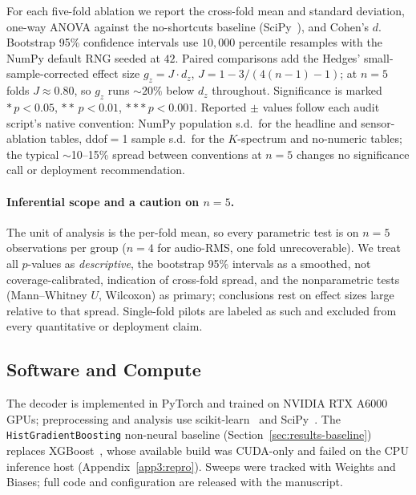 \documentclass[sensors,article,submit,moreauthors,pdftex]{Definitions/mdpi}
\begin{document}
For each five-fold ablation we report the cross-fold mean and standard deviation, one-way ANOVA against the no-shortcuts baseline (SciPy~\cite{virtanen2020scipy}), and Cohen's $d$. Bootstrap 95\% confidence intervals use $10{,}000$ percentile resamples with the NumPy default RNG seeded at $42$. Paired comparisons add the Hedges' small-sample-corrected effect size $g_z\!=\!J\!\cdot\!d_z$, $J\!=\!1\!-\!3/(4(n\!-\!1)\!-\!1)$; at $n\!=\!5$ folds $J\!\approx\!0.80$, so $g_z$ runs $\sim$$20\%$ below $d_z$ throughout. Significance is marked $\ast\,p<0.05$, $\ast\ast\,p<0.01$, $\ast\ast\ast\,p<0.001$. Reported $\pm$ values follow each audit script's native convention: NumPy population s.d.\ for the headline and sensor-ablation tables, ddof$=$1 sample s.d.\ for the $K$-spectrum and no-numeric tables; the typical $\sim$10--15\% spread between conventions at $n\!=\!5$ changes no significance call or deployment recommendation.

\paragraph{Inferential scope and a caution on $n=5$.} The unit of analysis is the per-fold mean, so every parametric test is on $n=5$ observations per group ($n=4$ for audio-RMS, one fold unrecoverable). We treat all $p$-values as \emph{descriptive}, the bootstrap 95\% intervals as a smoothed, not coverage-calibrated, indication of cross-fold spread, and the nonparametric tests (Mann--Whitney $U$, Wilcoxon) as primary; conclusions rest on effect sizes large relative to that spread. Single-fold pilots are labeled as such and excluded from every quantitative or deployment claim.

\subsection{Software and Compute}
\label{sec:software}

The decoder is implemented in PyTorch and trained on NVIDIA RTX A6000 GPUs; preprocessing and analysis use scikit-learn~\cite{pedregosa2011sklearn} and SciPy~\cite{virtanen2020scipy}. The \texttt{HistGradientBoosting} non-neural baseline (Section~\ref{sec:results-baseline}) replaces XGBoost~\cite{chen2016xgboost}, whose available build was CUDA-only and failed on the CPU inference host (Appendix~\ref{app3:repro}). Sweeps were tracked with Weights and Biases; full code and configuration are released with the manuscript.

\end{document}
